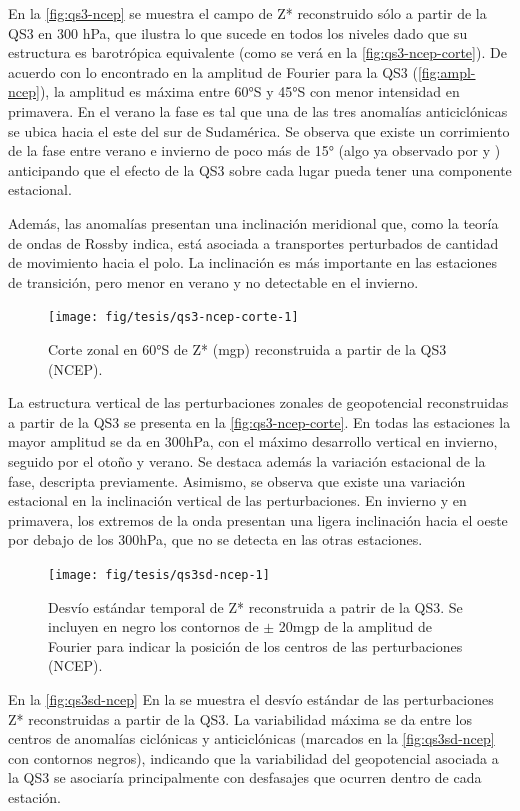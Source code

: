 \documentclass[spanish,a4paper,12pt,oneside]{book}
\begin{document}
En la \autoref{fig:qs3-ncep} se muestra el campo de Z* reconstruido sólo
a partir de la QS3 en 300 hPa, que ilustra lo que sucede en todos los
niveles dado que su estructura es barotrópica equivalente (como se verá
en la \autoref{fig:qs3-ncep-corte}). De acuerdo con lo encontrado en la
amplitud de Fourier para la QS3 (\autoref{fig:ampl-ncep}), la amplitud
es máxima entre 60°S y 45°S con menor intensidad en primavera. En el
verano la fase es tal que una de las tres anomalías anticiclónicas se
ubica hacia el este del sur de Sudamérica. Se observa que existe un
corrimiento de la fase entre verano e invierno de poco más de 15° (algo
ya observado por \textcite{Loon1972} y \textcite{Mo1985}) anticipando
que el efecto de la QS3 sobre cada lugar pueda tener una componente
estacional.

Además, las anomalías presentan una inclinación meridional que, como la
teoría de ondas de Rossby indica, está asociada a transportes
perturbados de cantidad de movimiento hacia el polo. La inclinación es
más importante en las estaciones de transición, pero menor en verano y
no detectable en el invierno.

\begin{figure}
\texttt{[image: fig/tesis/qs3-ncep-corte-1]} \caption{Corte zonal en 60°S de Z* (mgp) reconstruida a partir de la QS3 (NCEP).}\label{fig:qs3-ncep-corte}
\end{figure}

La estructura vertical de las perturbaciones zonales de geopotencial
reconstruidas a partir de la QS3 se presenta en la
\autoref{fig:qs3-ncep-corte}. En todas las estaciones la mayor amplitud
se da en 300hPa, con el máximo desarrollo vertical en invierno, seguido
por el otoño y verano. Se destaca además la variación estacional de la
fase, descripta previamente. Asimismo, se observa que existe una
variación estacional en la inclinación vertical de las perturbaciones.
En invierno y en primavera, los extremos de la onda presentan una ligera
inclinación hacia el oeste por debajo de los 300hPa, que no se detecta
en las otras estaciones.

\begin{figure}
\texttt{[image: fig/tesis/qs3sd-ncep-1]} \caption{Desvío estándar temporal de Z* reconstruida a patrir de la QS3. Se incluyen en negro los contornos de $\pm$ 20mgp de la amplitud de Fourier para indicar la posición de los centros de las perturbaciones (NCEP).}\label{fig:qs3sd-ncep}
\end{figure}

En la \autoref{fig:qs3sd-ncep} En la se muestra el desvío estándar de
las perturbaciones Z* reconstruidas a partir de la QS3. La variabilidad
máxima se da entre los centros de anomalías ciclónicas y anticiclónicas
(marcados en la \autoref{fig:qs3sd-ncep} con contornos negros),
indicando que la variabilidad del geopotencial asociada a la QS3 se
asociaría principalmente con desfasajes que ocurren dentro de cada
estación.
\end{document}
